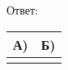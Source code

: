 \sepline
Ответ:
\begin{tabular}{|c|c|}
\hline
А) & Б) \\
\hline
\makecell{} & \makecell{} \\
\hline
\end{tabular}
